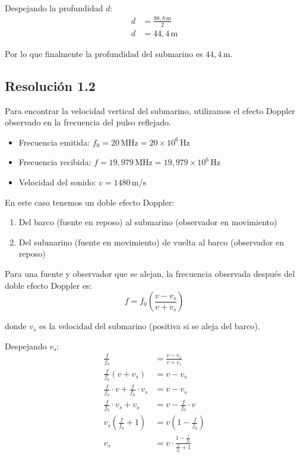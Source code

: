 \documentclass[
  11pt,
  letterpaper,
   addpoints,
   answers
  ]{exam}
\begin{document}
\begin{questions}
\begin{solution}
Despejando la profundidad $d$:
\begin{align}
d &= \frac{88{,}8\,\mathrm{m}}{2} \\
d &= 44{,}4\,\mathrm{m}
\end{align}

Por lo que finalmente la profundidad del submarino es $\boxed{44{,}4\,\mathrm{m}}$.

\subsection*{Resolución 1.2 }

Para encontrar la velocidad vertical del submarino, utilizamos el efecto Doppler observado en la frecuencia del pulso reflejado.

\begin{itemize}
    \item Frecuencia emitida: $f_0 = 20\,\mathrm{MHz} = 20 \times 10^6\,\mathrm{Hz}$
    \item Frecuencia recibida: $f = 19{,}979\,\mathrm{MHz} = 19{,}979 \times 10^6\,\mathrm{Hz}$
    \item Velocidad del sonido: $v = 1480\,\mathrm{m/s}$
\end{itemize}


En este caso tenemos un doble efecto Doppler:
\begin{enumerate}
    \item Del barco (fuente en reposo) al submarino (observador en movimiento)
    \item Del submarino (fuente en movimiento) de vuelta al barco (observador en reposo)
\end{enumerate}

Para una fuente y observador que se alejan, la frecuencia observada después del doble efecto Doppler es:
\begin{equation}
f = f_0 \left(\frac{v - v_s}{v + v_s}\right)
\end{equation}

donde $v_s$ es la velocidad del submarino (positiva si se aleja del barco).

Despejando $v_s$:
\begin{align}
\frac{f}{f_0} &= \frac{v - v_s}{v + v_s} \\
\frac{f}{f_0}(v + v_s) &= v - v_s \\
\frac{f}{f_0} \cdot v + \frac{f}{f_0} \cdot v_s &= v - v_s \\
\frac{f}{f_0} \cdot v_s + v_s &= v - \frac{f}{f_0} \cdot v \\
v_s\left(\frac{f}{f_0} + 1\right) &= v\left(1 - \frac{f}{f_0}\right) \\
v_s &= v \cdot \frac{1 - \frac{f}{f_0}}{\frac{f}{f_0} + 1}
\end{align}


\end{solution}
\end{questions}
\end{document}
